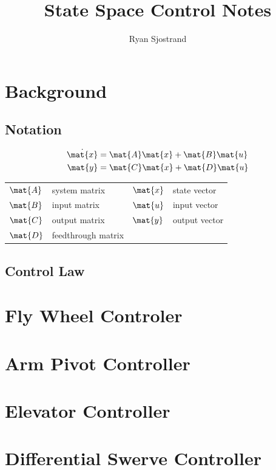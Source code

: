 \documentclass[11pt, oneside]{article}   	%
\title{State Space Control Notes}
\author{Ryan Sjostrand}
\begin{document}
\maketitle


\section{Background}

\subsection{Notation}


\begin{definition}%
  \begin{align}
    \dot{\mat{x}} &= \mat{A}\mat{x} + \mat{B}\mat{u} \label{eq:cont_ss_x} \\
    \mat{y} &= \mat{C}\mat{x} + \mat{D}\mat{u} \label{eq:cont_ss_y}
  \end{align}
  \begin{figurekey}
    \begin{tabular}{llll}
      $\mat{A}$ & system matrix      & $\mat{x}$ & state vector \\
      $\mat{B}$ & input matrix       & $\mat{u}$ & input vector \\
      $\mat{C}$ & output matrix      & $\mat{y}$ & output vector \\
      $\mat{D}$ & feedthrough matrix &  &  \\
    \end{tabular}
  \end{figurekey}
\end{definition}

\subsection{Control Law}


\section{Fly Wheel Controler}

\section{Arm Pivot Controller}

\section{Elevator Controller}

\section{Differential Swerve Controller}
\end{document}
